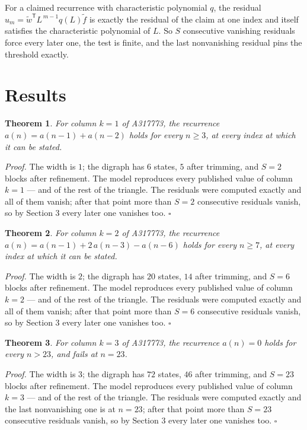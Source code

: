 \documentclass[11pt]{article}
\newtheorem{theorem}{Theorem}
\theoremstyle{definition}
\begin{document}
For a claimed recurrence with characteristic polynomial $q$, the residual $u_m = \tilde w^{\mathsf T}L^{\,m-1}q(L)\tilde f$ is exactly the residual of the claim at one index and itself satisfies the characteristic polynomial of $L$. So $S$ consecutive vanishing residuals force every later one, the test is finite, and the last nonvanishing residual pins the threshold exactly.

\section{Results}

\begin{theorem} For column $k = 1$ of A317773, the recurrence $a(n) = a(n-1) + a(n-2)$ holds for every $n \ge 3$, at every index at which it can be stated.\end{theorem}

{\itshape Proof.} The width is $1$; the digraph has $6$ states, $5$ after trimming, and $S = 2$ blocks after refinement. The model reproduces every published value of column $k = 1$ --- and of the rest of the triangle. The residuals were computed exactly and all of them vanish; after that point more than $S = 2$ consecutive residuals vanish, so by Section 3 every later one vanishes too. $\square$

\begin{theorem} For column $k = 2$ of A317773, the recurrence $a(n) = a(n-1) + 2\,a(n-3) - a(n-6)$ holds for every $n \ge 7$, at every index at which it can be stated.\end{theorem}

{\itshape Proof.} The width is $2$; the digraph has $20$ states, $14$ after trimming, and $S = 6$ blocks after refinement. The model reproduces every published value of column $k = 2$ --- and of the rest of the triangle. The residuals were computed exactly and all of them vanish; after that point more than $S = 6$ consecutive residuals vanish, so by Section 3 every later one vanishes too. $\square$

\begin{theorem} For column $k = 3$ of A317773, the recurrence $a(n) = 0$ holds for every $n > 23$, and fails at $n = 23$.\end{theorem}

{\itshape Proof.} The width is $3$; the digraph has $72$ states, $46$ after trimming, and $S = 23$ blocks after refinement. The model reproduces every published value of column $k = 3$ --- and of the rest of the triangle. The residuals were computed exactly and the last nonvanishing one is at $n = 23$; after that point more than $S = 23$ consecutive residuals vanish, so by Section 3 every later one vanishes too. $\square$
\end{document}
